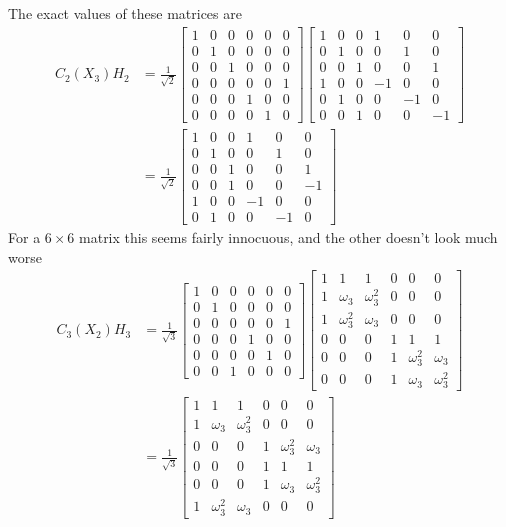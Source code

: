 The exact values of these matrices are
\begin{align*}
	C_2(X_3)H_2 &=
	\frac{1}{\sqrt{2}}
	\begin{bmatrix}
		1&0&0&0&0&0\\
		0&1&0&0&0&0\\ 
		0&0&1&0&0&0\\ 
		0&0&0&0&0&1\\ 
		0&0&0&1&0&0\\ 
		0&0&0&0&1&0
	\end{bmatrix}
	\begin{bmatrix}
		1&0&0&1&0&0\\ 
		0&1&0&0&1&0\\ 
		0&0&1&0&0&1\\ 
		1&0&0&-1&0&0\\ 
		0&1&0&0&-1&0\\ 
		0&0&1&0&0&-1
	\end{bmatrix}
	\\&=
	\frac{1}{\sqrt{2}}
	\begin{bmatrix}
		1&0&0&1&0&0\\ 
		0&1&0&0&1&0\\ 
		0&0&1&0&0&1\\ 
		0&0&1&0&0&-1\\ 
		1&0&0&-1&0&0\\ 
		0&1&0&0&-1&0
	\end{bmatrix}
\end{align*}
For a $6\times6$ matrix this seems fairly innocuous, and the other doesn't look much worse
\begin{align*}
	C_3(X_2)H_3 &=
	\frac{1}{\sqrt{3}}
	\begin{bmatrix}
		1&0&0&0&0&0\\
		0&1&0&0&0&0\\ 
		0&0&0&0&0&1\\ 
		0&0&0&1&0&0\\ 
		0&0&0&0&1&0\\ 
		0&0&1&0&0&0
	\end{bmatrix}
	\begin{bmatrix}
		1&1&1&0&0&0\\ 
		1&\omega_3&\omega_3^2&0&0&0\\ 
		1&\omega_3^2&\omega_3&0&0&0\\ 
		0&0&0&1&1&1\\ 
		0&0&0&1&\omega_3^2&\omega_3\\ 
		0&0&0&1&\omega_3&\omega_3^2
	\end{bmatrix}
	\\&=
	\frac{1}{\sqrt{3}}
	\begin{bmatrix}
		1&1&1&0&0&0\\ 
		1&\omega_3&\omega_3^2&0&0&0\\
		0&0&0&1&\omega_3^2&\omega_3\\ 
		0&0&0&1&1&1\\ 
		0&0&0&1&\omega_3&\omega_3^2\\
		1&\omega_3^2&\omega_3&0&0&0
	\end{bmatrix}
\end{align*}

